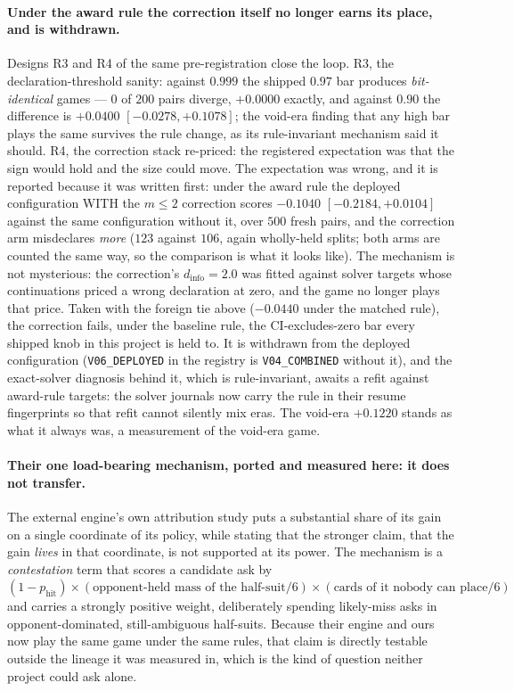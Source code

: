 \documentclass[11pt,letterpaper]{article}
\begin{document}
\paragraph{Under the award rule the correction itself no longer earns its
place, and is withdrawn.} Designs R3 and R4 of the same pre-registration
close the loop. R3, the declaration-threshold sanity: against $0.999$ the
shipped $0.97$ bar produces \emph{bit-identical} games --- $0$ of $200$
pairs diverge, $+0.0000$ exactly, and against $0.90$ the difference is
$+0.0400$ $[-0.0278, +0.1078]$; the void-era finding that any high bar
plays the same survives the rule change, as its rule-invariant mechanism
said it should. R4, the correction stack re-priced: the registered
expectation was that the sign would hold and the size could move. The
expectation was wrong, and it is reported because it was written first:
under the award rule the deployed configuration WITH the $m \le 2$
correction scores $-0.1040$ $[-0.2184, +0.0104]$ against the same
configuration without it, over $500$ fresh pairs, and the correction arm
misdeclares \emph{more} ($123$ against $106$, again wholly-held splits; both
arms are counted the same way, so the comparison is what it looks like). The mechanism is not
mysterious: the correction's $d_{\text{info}} = 2.0$ was fitted against
solver targets whose continuations priced a wrong declaration at zero, and
the game no longer plays that price. Taken with the foreign tie above
($-0.0440$ under the matched rule), the correction fails, under the
baseline rule, the CI-excludes-zero bar every shipped knob in this project
is held to. It is withdrawn from the deployed configuration
(\texttt{V06\_DEPLOYED} in the registry is \texttt{V04\_COMBINED} without it),
and the exact-solver diagnosis behind it, which is rule-invariant,
awaits a refit against award-rule targets: the solver journals now carry
the rule in their resume fingerprints so that refit cannot silently mix
eras. The void-era $+0.1220$ stands as what it always was, a measurement
of the void-era game.

\paragraph{Their one load-bearing mechanism, ported and measured here: it
does not transfer.} The external engine's own attribution study puts a
substantial share of its gain on a single coordinate of its policy, while
stating that the stronger claim, that the gain \emph{lives} in that
coordinate, is not supported at its power. The mechanism is a
\emph{contestation} term that scores a candidate ask by
$(1 - p_{\text{hit}}) \times (\text{opponent-held mass of the half-suit}/6)
\times (\text{cards of it nobody can place}/6)$ and carries a strongly
positive weight, deliberately spending likely-miss asks in
opponent-dominated, still-ambiguous half-suits. Because their engine and
ours now play the same game under the same rules, that claim is directly
testable outside the lineage it was measured in, which is the kind of
question neither project could ask alone.
\end{document}
